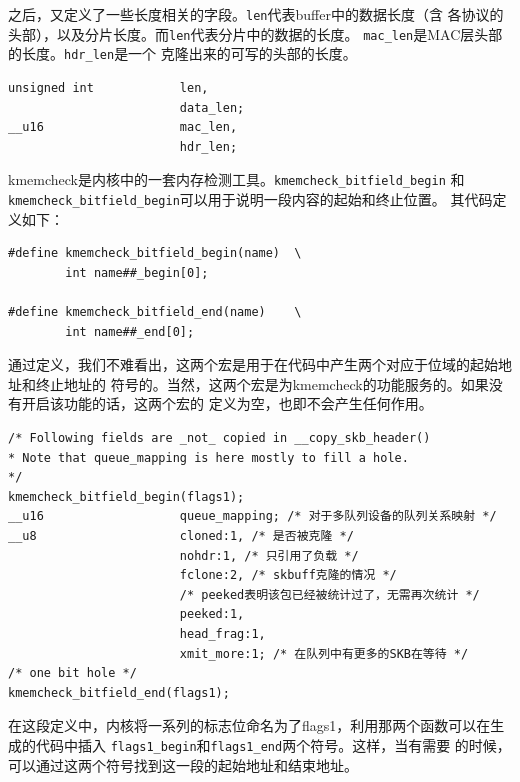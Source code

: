 \documentclass[11pt, a4paper,oneside]{book}
\theoremstyle{ocrenumbox}
\theoremstyle{purplenumbox}
\theoremstyle{blackbox}
\begin{document}
之后，又定义了一些长度相关的字段。\texttt{len}代表buffer中的数据长度（含
各协议的头部），以及分片长度。而\texttt{len}代表分片中的数据的长度。
\texttt{mac_len}是MAC层头部的长度。\texttt{hdr_len}是一个
克隆出来的可写的头部的长度。
\begin{verbatim}
unsigned int            len,
                        data_len;
__u16                   mac_len,
                        hdr_len;
\end{verbatim}

kmemcheck是内核中的一套内存检测工具。\texttt{kmemcheck_bitfield_begin}
和\texttt{kmemcheck_bitfield_begin}可以用于说明一段内容的起始和终止位置。
其代码定义如下：
\begin{verbatim}
#define kmemcheck_bitfield_begin(name)  \
        int name##_begin[0];

#define kmemcheck_bitfield_end(name)    \
        int name##_end[0];
\end{verbatim}

通过定义，我们不难看出，这两个宏是用于在代码中产生两个对应于位域的起始地址和终止地址的
符号的。当然，这两个宏是为kmemcheck的功能服务的。如果没有开启该功能的话，这两个宏的
定义为空，也即不会产生任何作用。
\begin{verbatim}
/* Following fields are _not_ copied in __copy_skb_header()
* Note that queue_mapping is here mostly to fill a hole.
*/
kmemcheck_bitfield_begin(flags1);
__u16                   queue_mapping; /* 对于多队列设备的队列关系映射 */
__u8                    cloned:1, /* 是否被克隆 */
                        nohdr:1, /* 只引用了负载 */
                        fclone:2, /* skbuff克隆的情况 */
                        /* peeked表明该包已经被统计过了，无需再次统计 */
                        peeked:1,
                        head_frag:1,
                        xmit_more:1; /* 在队列中有更多的SKB在等待 */
/* one bit hole */
kmemcheck_bitfield_end(flags1);
\end{verbatim}
在这段定义中，内核将一系列的标志位命名为了flags1，利用那两个函数可以在生成的代码中插入
\texttt{flags1_begin}和\texttt{flags1_end}两个符号。这样，当有需要
的时候，可以通过这两个符号找到这一段的起始地址和结束地址。
\end{document}

